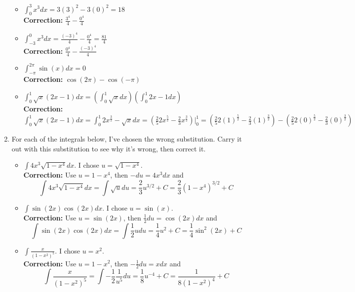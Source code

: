 \documentclass{article}
\begin{document}
\begin{enumerate}
\begin{itemize}
    \item $\int_0^3 x^3 dx = 3(3)^2 - 3(0)^2 = 18$\\
    \textbf{Correction:} $\frac{3^4}{4} - \frac{0^4}{4}$

    \item $\int_{-3}^0 x^3 dx = \frac{(-3)^4}{4} - \frac{0^4}{4} = \frac{81}{4}$\\
    \textbf{Correction:} $\frac{0^4}{4} - \frac{(-3)^4}{4}$

    \item $\int_{-\pi}^{2\pi} \sin(x) dx = 0$\\
    \textbf{Correction:} $\cos(2\pi) - \cos(-\pi)$

    \item $\int_0^1 \sqrt{x}(2x -1) dx = \left(\int_0^1 \sqrt{x}dx\right) \left( \int_0^1 2x-1 dx \right)$\\
    \textbf{Correction:}$\int_0^1 \sqrt{x}(2x -1) dx = \int_0^1 2x^{\frac{3}{2}} - \sqrt{x} dx = (\frac{2}{5} 2x^{\frac{5}{2}} - \frac{2}{3}x^{\frac{3}{2}}) |_0^1 = (\frac{2}{5} 2(1)^{\frac{5}{2}} - \frac{2}{3}(1)^{\frac{3}{2}}) - (\frac{2}{5} 2(0)^{\frac{5}{2}} - \frac{2}{3}(0)^{\frac{3}{2}})$

\end{itemize}
\item For each of the integrals below, I've chosen the wrong substitution. Carry it out with this substitution to see why it's wrong, then correct it.
\begin{itemize}
    \item $\int 4x^3\sqrt{1 - x^4} dx$. I chose $u = \sqrt{1-x^4}$.\\
    \textbf{Correction:} Use $u = 1 - x^4$, then $-du = 4x^3dx$ and $$\int 4x^3\sqrt{1 - x^4} dx = \int \sqrt{u} du = \frac{2}{3}u^{3/2} + C = \frac{2}{3}(1 - x^4)^{3/2} + C $$

    \item $\int \sin(2x)\cos(2x) dx$. I chose $u = \sin(x)$.\\
    \textbf{Correction:} Use $u = \sin(2x)$, then $\frac{1}{2}du = \cos(2x) dx$ and $$\int \sin(2x)\cos(2x) dx = \int \frac{1}{2} u du = \frac{1}{4} u^2 + C =  \frac{1}{4} \sin^2(2x) + C$$

    \item $\int \frac{x}{(1-x^2)^5}$. I chose $u = x^2$.\\
    \textbf{Correction:} Use $u = 1-x^2$, then $-\frac{1}{2}du = x dx$ and $$\int \frac{x}{(1-x^2)^5} = \int -\frac{1}{2} \frac{1}{u^5} du = \frac{1}{8} u^{-4} + C = \frac{1}{8(1-x^2)^4} + C$$

\end{itemize}

\end{enumerate}
\end{document}
